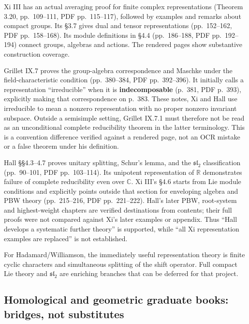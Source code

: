 \documentclass[
  11pt,
]{article}
\begin{document}
Xi III has an actual averaging proof for finite complex representations
(Theorem 3.20, pp.~109--111, PDF pp.~115--117), followed by examples and
remarks about compact groups. Its §3.7 gives dual and tensor
representations (pp.~152--162, PDF pp.~158--168). Its module definitions
in §4.4 (pp.~186--188, PDF pp.~192--194) connect groups, algebras and
actions. The rendered pages show substantive construction coverage.

Grillet IX.7 proves the group-algebra correspondence and Maschke under
the field-characteristic condition (pp.~380--384, PDF pp.~392--396). It
initially calls a representation ``irreducible'' when it is
\textbf{indecomposable} (p.~381, PDF p.~393), explicitly making that
correspondence on p.~383. These notes, Xi and Hall use irreducible to
mean a nonzero representation with no proper nonzero invariant subspace.
Outside a semisimple setting, Grillet IX.7.1 must therefore not be read
as an unconditional complete reducibility theorem in the latter
terminology. This is a convention difference verified against a rendered
page, not an OCR mistake or a false theorem under his definition.

Hall §§4.3--4.7 proves unitary splitting, Schur's lemma, and the
\(\mathfrak{sl}_2\) classification (pp.~90--101, PDF pp.~103--114). Its
unipotent representation of \(\mathbb R\) demonstrates failure of
complete reducibility even over \(\mathbb C\). Xi III's §4.6 starts from
Lie module conditions and explicitly points outside that section for
enveloping algebra and PBW theory (pp.~215--216, PDF pp.~221--222).
Hall's later PBW, root-system and highest-weight chapters are verified
destinations from contents; their full proofs were not compared against
Xi's later examples or appendix. Thus ``Hall develops a systematic
further theory'' is supported, while ``all Xi representation examples
are replaced'' is not established.

For Hadamard/Williamson, the immediately useful representation theory is
finite cyclic characters and simultaneous splitting of the shift
operator. Full compact Lie theory and \(\mathfrak{sl}_2\) are enriching
branches that can be deferred for that project.

\subsection{Homological and geometric graduate books: bridges, not
substitutes}\label{homological-and-geometric-graduate-books-bridges-not-substitutes}
\end{document}
